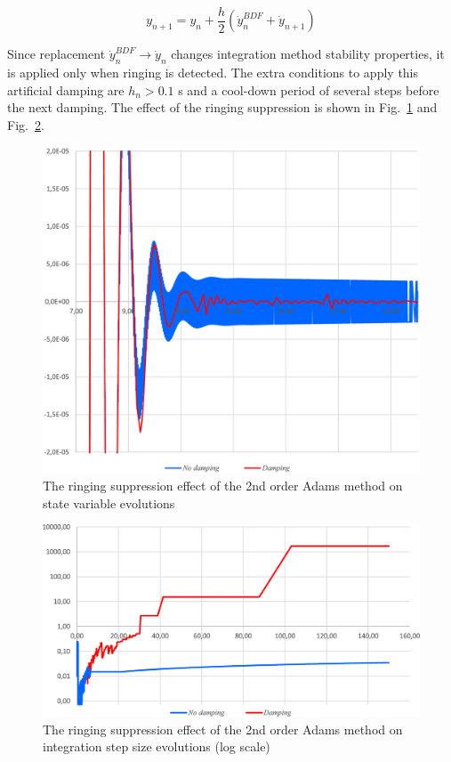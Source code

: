 \documentclass[lettersize,journal]{IEEEtran}
\begin{document}
\begin{equation}
	\label{eqn_modadams}
	y_{n+1}=y_n+\frac{h}{2}\left(\dot{y}_n^{BDF}+\dot{y}_{n+1} \right)
\end{equation}

Since replacement \(\dot{y}_n^{BDF} \rightarrow \dot{y}_n\) changes integration method stability properties, it is applied only when ringing is detected. The extra conditions to apply this artificial damping are \(h_n>0.1\) s and a cool-down period of several steps before the next damping. The effect of the ringing suppression is shown in Fig.~\ref{fig_adams_damping_variable} and Fig.~\ref{fig_adams_damping_step}.

\begin{figure}[htbp]
	\centering
	\includegraphics[width=0.8\columnwidth]{adams_damping_variable.eps}
	\caption{The ringing suppression effect of the 2nd order Adams method on state variable evolutions }
	\label{fig_adams_damping_variable}
\end{figure}

\begin{figure}[htbp]
	\centering
	\includegraphics[width=0.8\columnwidth]{adams_damping_step.eps}
	\caption{The ringing suppression effect of the 2nd order Adams method on integration step size evolutions (log scale) }
	\label{fig_adams_damping_step}
\end{figure}
\end{document}
